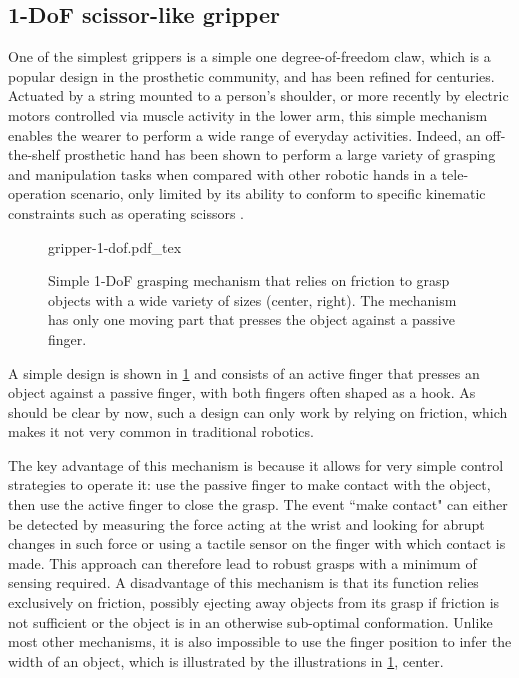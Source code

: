 \subsection{1-DoF scissor-like gripper}

One of the simplest grippers is a simple one degree-of-freedom claw, which is a popular design in the prosthetic community, and has been refined for centuries. Actuated by a string mounted to a person's shoulder, or more recently by electric motors controlled via muscle activity in the lower arm, this simple mechanism enables the wearer to perform a wide range of everyday activities. Indeed, an off-the-shelf prosthetic hand has been shown to perform a large variety of grasping and manipulation tasks when compared with other robotic hands in a tele-operation scenario, only limited by its ability to conform to specific kinematic constraints such as operating scissors \cite{patel2016manipulation}.

\begin{figure}
    \def\svgwidth{\textwidth}
    {gripper-1-dof.pdf_tex}
    \caption{Simple 1-DoF grasping mechanism that relies on friction to grasp objects with a wide variety of sizes (center, right). The mechanism has only one moving part that presses the object against a passive finger.}\label{fig:gripper-1-dof}
\end{figure}

A simple design is shown in \cref{fig:gripper-1-dof} and consists of an active finger that presses an object against a passive finger, with both fingers often shaped as a hook. As should be clear by now, such a design can only work by relying on friction, which makes it not very common in traditional robotics.

The key advantage of this mechanism is because it allows for very simple control strategies to operate it: use the passive finger to make contact with the object, then use the active finger to close the grasp.
The event ``make contact" can either be detected by measuring the force acting at the wrist and looking for abrupt changes in such force or using a tactile sensor on the finger with which contact is made. This approach can therefore lead to robust grasps with a minimum of sensing required. A disadvantage of this mechanism is that its function relies exclusively on friction, possibly ejecting away objects from its grasp if friction is not sufficient or the object is in an otherwise sub-optimal conformation. Unlike most other mechanisms, it is also impossible to use the finger position to infer the width of an object, which is illustrated by the illustrations in \cref{fig:gripper-1-dof}, center.

